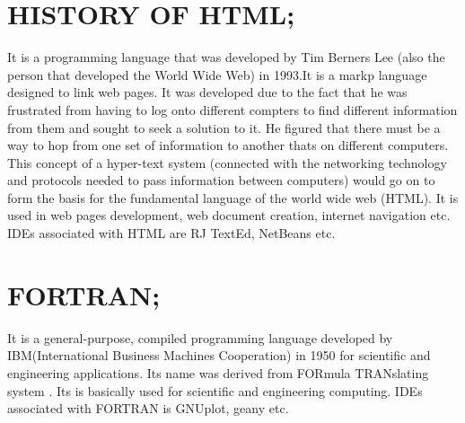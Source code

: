 \documentclass{article}
\begin{document}
	\section{HISTORY OF HTML;}
	It is a programming language that was developed by Tim Berners Lee (also the person that developed the World Wide Web) in 1993.It is a markp language designed to link web pages.
	It was developed due to the fact that he was frustrated from having to log onto different compters to find different information from them and sought to seek a solution to it.
	He figured that there must be a way to hop from one set of information to another thats on different computers. This concept of a hyper-text system (connected with the networking technology and protocols needed to pass information between computers) would go on to form the basis for the fundamental language of the world wide web (HTML).
	It is used in web pages development, web document creation, internet navigation etc.
	IDEs associated with HTML are RJ TextEd, NetBeans etc.
	\newpage
	\section{FORTRAN;}
	It is a general-purpose, compiled programming language developed by IBM(International Business Machines Cooperation) in 1950 for scientific and engineering applications.
	Its name was derived from FORmula TRANslating system .
	Its is basically used for scientific and engineering computing.
	IDEs associated with FORTRAN is GNUplot, geany etc.
	
	
	
\end{document}

